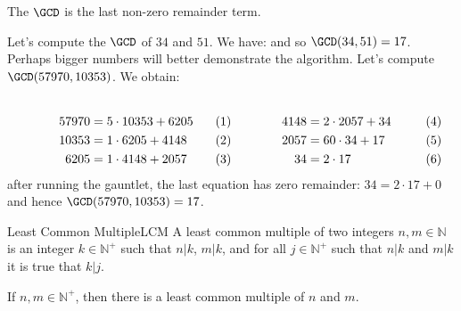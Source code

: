 \documentclass{article}                                                        %
\begin{document}
            The $\GCD$ is the last non-zero remainder term.
            \begin{example}
                Let's compute the $\GCD$ of $34$ and $51$. We have:
                and so $\GCD(34,51)=17$. Perhaps bigger numbers will better
                demonstrate the algorithm. Let's compute $\GCD(57970,10353)$. We
                obtain:
                \par
                \begin{subequations}
                    \begin{minipage}[b]{0.49\textwidth}
                        \centering
                        \begin{align}
                            57970&=5\cdot{10353}+6205\\
                            10353&=1\cdot{6205}+4148\\
                            6205&=1\cdot{4148}+2057
                        \end{align}
                    \end{minipage}
                    \hfill
                    \begin{minipage}[b]{0.49\textwidth}
                        \centering
                        \begin{align}
                            4148&=2\cdot{2057}+34\\
                            2057&=60\cdot{34}+17\\
                            34&=2\cdot{17}
                        \end{align}
                    \end{minipage}
                \end{subequations}
                after running the gauntlet, the last equation has zero remainder:
                $34=2\cdot{17}+0$ and hence $\GCD(57970,10353)=17$.
            \end{example}
            \begin{fdefinition}{Least Common Multiple}{LCM}
                A least common multiple of two integers $n,m\in\mathbb{N}$ is an
                integer $k\in\mathbb{N}^{+}$ such that $n|k$, $m|k$, and for all
                $j\in\mathbb{N}^{+}$ such that $n|k$ and $m|k$ it is true that
                $k|j$.
            \end{fdefinition}
            \begin{theorem}
                \label{thm:LCM_Existence_Theorem}%
                If $n,m\in\mathbb{N}^{+}$, then there is a least common multiple of
                $n$ and $m$.
            \end{theorem}
\end{document}
